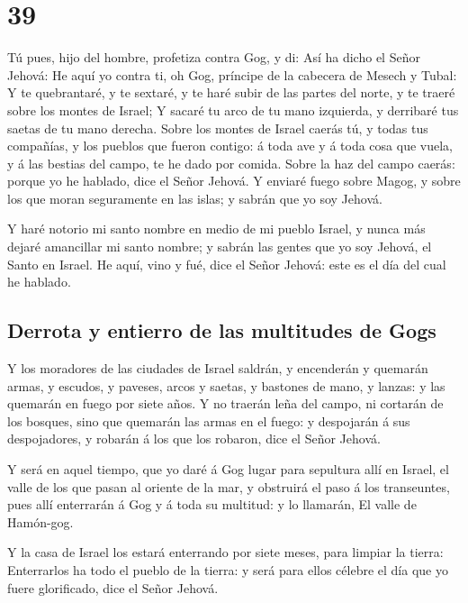 \hypertarget{section-26-39}{%
\section{39}\label{section-26-39}}

 Tú pues, hijo del hombre, profetiza contra Gog, y di: Así
ha dicho el Señor Jehová: He aquí yo contra ti, oh Gog, príncipe de la
cabecera de Mesech y Tubal:  Y te quebrantaré, y te
sextaré, y te haré subir de las partes del norte, y te traeré sobre los
montes de Israel;  Y sacaré tu arco de tu mano izquierda,
y derribaré tus saetas de tu mano derecha.  Sobre los
montes de Israel caerás tú, y todas tus compañías, y los pueblos que
fueron contigo: á toda ave y á toda cosa que vuela, y á las bestias del
campo, te he dado por comida.  Sobre la haz del campo
caerás: porque yo he hablado, dice el Señor Jehová.  Y
enviaré fuego sobre Magog, y sobre los que moran seguramente en las
islas; y sabrán que yo soy Jehová.

 Y haré notorio mi santo nombre en medio de mi pueblo
Israel, y nunca más dejaré amancillar mi santo nombre; y sabrán las
gentes que yo soy Jehová, el Santo en Israel.  He aquí,
vino y fué, dice el Señor Jehová: este es el día del cual he hablado.

\hypertarget{derrota-y-entierro-de-las-multitudes-de-gogs}{%
\subsection{Derrota y entierro de las multitudes de
Gogs}\label{derrota-y-entierro-de-las-multitudes-de-gogs}}

 Y los moradores de las ciudades de Israel saldrán, y
encenderán y quemarán armas, y escudos, y paveses, arcos y saetas, y
bastones de mano, y lanzas: y las quemarán en fuego por siete años.
 Y no traerán leña del campo, ni cortarán de los bosques,
sino que quemarán las armas en el fuego: y despojarán á sus
despojadores, y robarán á los que los robaron, dice el Señor Jehová.

 Y será en aquel tiempo, que yo daré á Gog lugar para
sepultura allí en Israel, el valle de los que pasan al oriente de la
mar, y obstruirá el paso á los transeuntes, pues allí enterrarán á Gog y
á toda su multitud: y lo llamarán, El valle de Hamón-gog.

 Y la casa de Israel los estará enterrando por siete
meses, para limpiar la tierra:  Enterrarlos ha todo el
pueblo de la tierra: y será para ellos célebre el día que yo fuere
glorificado, dice el Señor Jehová.

